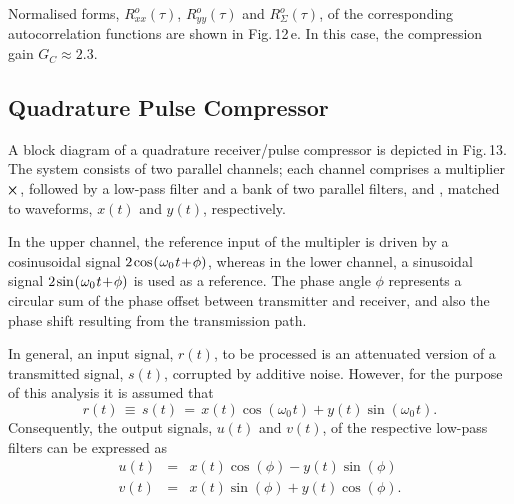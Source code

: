 \documentclass[journal]{IEEEtran}
\begin{document}
Normalised forms, $R^o_{xx}(\tau)$, $R^o_{yy}(\tau)$ and $R^o_\Sigma(\tau)$, of the corresponding autocorrelation functions are shown in Fig.\,12\,e. In this case, the compression gain $G_C \approx 2.3$.

\subsection{Quadrature Pulse Compressor}
A block diagram of a quadrature receiver/pulse compressor is depicted in Fig.\,13. The system consists of two parallel channels; each channel comprises a multiplier 
$\mspace{-2mu}{\boldsymbol{\times}}$, followed by a low-pass filter {} 
and a bank of two parallel filters, {} and {}, matched to waveforms, $x(t)$ and $y(t)$, respectively. 

In the upper channel, the reference input of the multipler is 
driven by a cosinusoidal signal 
$2\mspace{-1mu} \cos \mspace{-2mu}\left(\mspace{1mu} \omega_0\mspace{1mu}t \!+\! \phi \right)$,
 whereas in the lower channel, a sinusoidal signal 
$2\mspace{-1mu} \sin \mspace{-2mu}\left(\mspace{1mu} \omega_0\mspace{1mu}t \!+\! \phi \right)$
is used as a reference. 
The phase angle $\phi$ represents a circular sum of the phase offset between transmitter and receiver, and also the phase shift resulting from the transmission path.

In general, an input signal, $r(t)$, to be processed is an attenuated version of a transmitted signal, $s(t)$, corrupted by additive noise. However, for the purpose of this analysis it is assumed that 
\begin{equation}
r(t)\, \equiv \, s(t) \,=\, 
x(t)\cos(\omega_0\mspace{1mu} t) + y(t)\sin(\omega_0\mspace{1mu} t).	
\end{equation}
Consequently, the output signals, $u(t)$ and $v(t)$, of the respective low-pass filters can be expressed as
\begin{eqnarray}
	u(t) \!\! &\!\!=\!\!& \! x(t) \cos(\phi) -y(t) \sin(\phi)\\
	v(t) \!\! &\!\!=\!\!& \! x(t) \sin(\phi) +y(t) \cos(\phi).
\end{eqnarray} 
\end{document}
